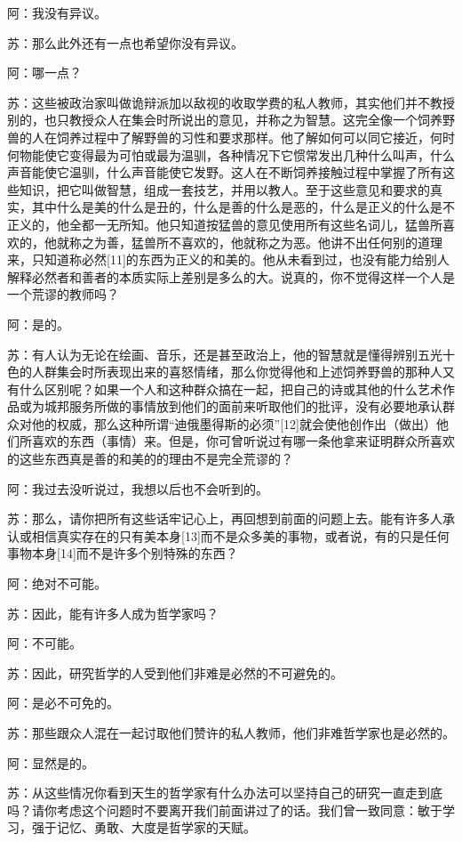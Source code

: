 \documentclass[12pt,oneside]{book}
\begin{document}
阿：我没有异议。

苏：那么此外还有一点也希望你没有异议。

阿：哪一点？

苏：这些被政治家叫做诡辩派加以敌视的收取学费的私人教师，其实他们并不教授别的，也只教授众人在集会时所说出的意见，并称之为智慧。这完全像一个饲养野兽的人在饲养过程中了解野兽的习性和要求那样。他了解如何可以同它接近，何时何物能使它变得最为可怕或最为温驯，各种情况下它惯常发出几种什么叫声，什么声音能使它温驯，什么声音能使它发野。这人在不断饲养接触过程中掌握了所有这些知识，把它叫做智慧，组成一套技艺，并用以教人。至于这些意见和要求的真实，其中什么是美的什么是丑的，什么是善的什么是恶的，什么是正义的什么是不正义的，他全都一无所知。他只知道按猛兽的意见使用所有这些名词儿，猛兽所喜欢的，他就称之为善，猛兽所不喜欢的，他就称之为恶。他讲不出任何别的道理来，只知道称必然[11]的东西为正义的和美的。他从未看到过，也没有能力给别人解释必然者和善者的本质实际上差别是多么的大。说真的，你不觉得这样一个人是一个荒谬的教师吗？

阿：是的。

苏：有人认为无论在绘画、音乐，还是甚至政治上，他的智慧就是懂得辨别五光十色的人群集会时所表现出来的喜怒情绪，那么你觉得他和上述饲养野兽的那种人又有什么区别呢？如果一个人和这种群众搞在一起，把自己的诗或其他的什么艺术作品或为城邦服务所做的事情放到他们的面前来听取他们的批评，没有必要地承认群众对他的权威，那么这种所谓“迪俄墨得斯的必须”[12]就会使他创作出（做出）他们所喜欢的东西（事情）来。但是，你可曾听说过有哪一条他拿来证明群众所喜欢的这些东西真是善的和美的的理由不是完全荒谬的？

阿：我过去没听说过，我想以后也不会听到的。

苏：那么，请你把所有这些话牢记心上，再回想到前面的问题上去。能有许多人承认或相信真实存在的只有美本身[13]而不是众多美的事物，或者说，有的只是任何事物本身[14]而不是许多个别特殊的东西？

阿：绝对不可能。

苏：因此，能有许多人成为哲学家吗？

阿：不可能。

苏：因此，研究哲学的人受到他们非难是必然的不可避免的。

阿：是必不可免的。

苏：那些跟众人混在一起讨取他们赞许的私人教师，他们非难哲学家也是必然的。

阿：显然是的。

苏：从这些情况你看到天生的哲学家有什么办法可以坚持自己的研究一直走到底吗？请你考虑这个问题时不要离开我们前面讲过了的话。我们曾一致同意：敏于学习，强于记忆、勇敢、大度是哲学家的天赋。
\end{document}
